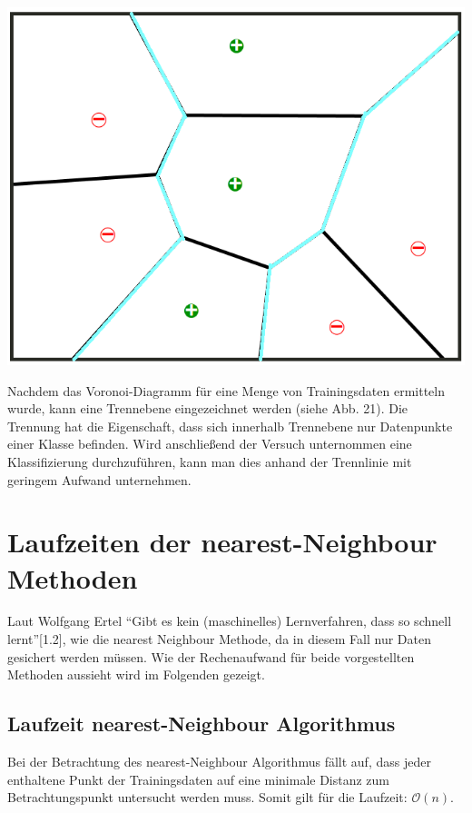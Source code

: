 \documentclass[fontsize=11pt]{scrartcl}
\newenvironment{Figure}
  {\par\medskip\noindent\minipage{\linewidth}}
  {\endminipage\par\medskip}
\begin{document}
            \begin{Figure}
                \centering
                \includegraphics[scale=0.4]{vor3.png}
            \end{Figure}        
            
                        
            Nachdem das Voronoi-Diagramm für eine Menge von Trainingsdaten ermitteln wurde, kann eine Trennebene eingezeichnet werden (siehe Abb. 21). Die Trennung hat die Eigenschaft, dass sich innerhalb Trennebene nur Datenpunkte einer Klasse befinden. Wird anschließend der Versuch unternommen eine Klassifizierung durchzuführen, kann man dies anhand der Trennlinie mit geringem Aufwand unternehmen.
                         
        \section{Laufzeiten der nearest-Neighbour Methoden}
            Laut Wolfgang Ertel “Gibt es kein (maschinelles) Lernverfahren, dass so schnell lernt”[1.2], wie die nearest Neighbour Methode, da in diesem Fall nur Daten gesichert werden müssen. Wie der Rechenaufwand für beide vorgestellten Methoden aussieht wird im Folgenden gezeigt.
                        
            \subsection{Laufzeit nearest-Neighbour Algorithmus}
                Bei der Betrachtung des nearest-Neighbour Algorithmus fällt auf, dass jeder enthaltene Punkt der Trainingsdaten auf eine minimale Distanz zum Betrachtungspunkt untersucht werden muss. Somit gilt für die Laufzeit:
                $\mathcal{O}(n)$.   
            
\end{document}
